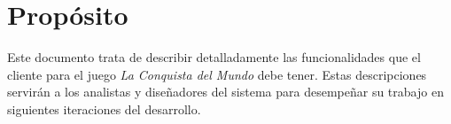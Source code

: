 \section{Propósito}

Este documento trata de describir detalladamente las funcionalidades que el
cliente para el juego \textit{La Conquista del Mundo} debe tener. Estas
descripciones servirán a los analistas y diseñadores del sistema para
desempeñar su trabajo en siguientes iteraciones del desarrollo.
